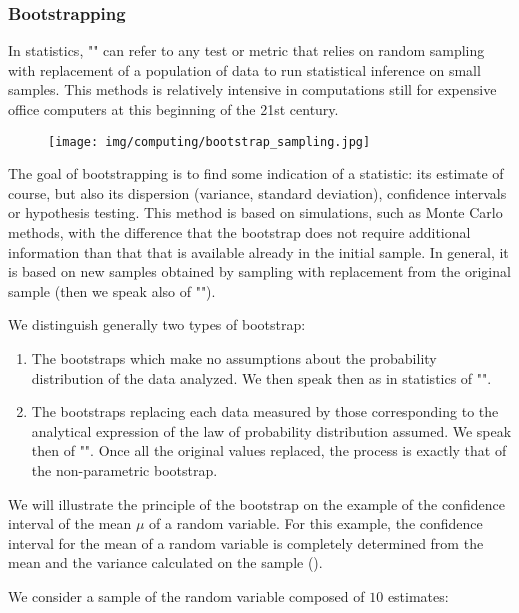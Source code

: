 	\subsubsection{Bootstrapping}
	In statistics, "" can refer to any test or metric that relies on random sampling with replacement of a population of data to run statistical inference on small samples. This methods is relatively intensive in computations still for expensive office computers at this beginning of the 21st century.  
	\begin{figure}[H]
		\centering
		\texttt{[image: img/computing/bootstrap\_sampling.jpg]}
	\end{figure}
	The goal of bootstrapping is to find some indication of a statistic: its estimate of course, but also its dispersion (variance, standard deviation), confidence intervals or hypothesis testing. This method is based on simulations, such as Monte Carlo methods, with the difference that the bootstrap does not require additional information than that that is available already in the initial sample. In general, it is based on new samples obtained by sampling with replacement from the original sample (then we speak also of "").
	
	We distinguish generally two types of bootstrap:
	\begin{enumerate}
		\item The bootstraps which make no assumptions about the probability distribution of the data analyzed. We then speak then as in statistics of "".

		\item The bootstraps replacing each data measured by those corresponding to the analytical expression of the law of probability distribution assumed. We speak then of "". Once all the original values replaced, the process is exactly that of the non-parametric bootstrap.
	\end{enumerate}
	We will illustrate the principle of the bootstrap on the example of the confidence interval of the mean $\mu$ of a random variable. For this example, the confidence interval for the mean of a random variable is completely determined from the mean and the variance calculated on the sample ().

	We consider a sample of the random variable composed of $10$ estimates:
	
